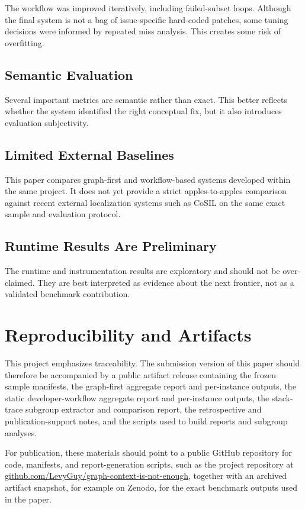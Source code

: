\documentclass[11pt]{article}
\begin{document}
The workflow was improved iteratively, including failed-subset loops. Although the final system is not a bag of issue-specific hard-coded patches, some tuning decisions were informed by repeated miss analysis. This creates some risk of overfitting.

\subsection{Semantic Evaluation}

Several important metrics are semantic rather than exact. This better reflects whether the system identified the right conceptual fix, but it also introduces evaluation subjectivity.

\subsection{Limited External Baselines}

This paper compares graph-first and workflow-based systems developed within the same project. It does not yet provide a strict apples-to-apples comparison against recent external localization systems such as CoSIL on the same exact sample and evaluation protocol.

\subsection{Runtime Results Are Preliminary}

The runtime and instrumentation results are exploratory and should not be over-claimed. They are best interpreted as evidence about the next frontier, not as a validated benchmark contribution.

\section{Reproducibility and Artifacts}

This project emphasizes traceability. The submission version of this paper should therefore be accompanied by a public artifact release containing the frozen sample manifests, the graph-first aggregate report and per-instance outputs, the static developer-workflow aggregate report and per-instance outputs, the stack-trace subgroup extractor and comparison report, the retrospective and publication-support notes, and the scripts used to build reports and subgroup analyses.

For publication, these materials should point to a public GitHub repository for code, manifests, and report-generation scripts, such as the project repository at \href{https://github.com/LevyGuy/graph-context-is-not-enough}{github.com/LevyGuy/graph-context-is-not-enough}, together with an archived artifact snapshot, for example on Zenodo, for the exact benchmark outputs used in the paper.
\end{document}
